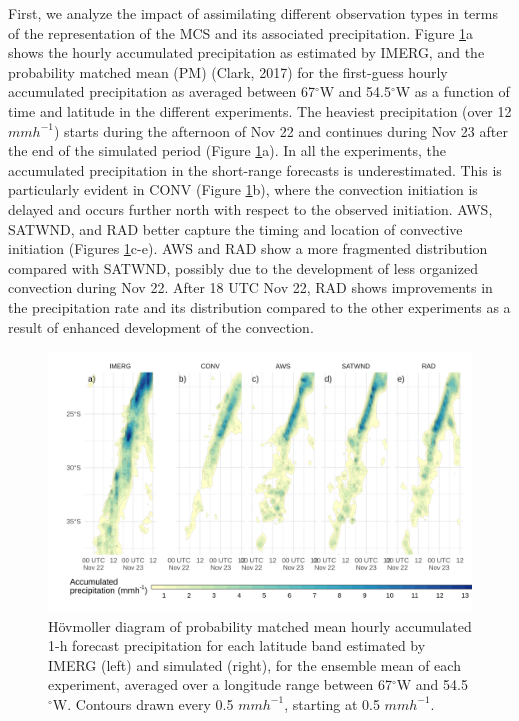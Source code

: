\documentclass[authoryear,preprint,review,12pt]{elsarticle} %
\begin{document}
First, we analyze the impact of assimilating different observation types in terms of the representation of the MCS and its associated precipitation. Figure \ref{fig:pp-hov}a shows the hourly accumulated precipitation as estimated by IMERG, and the probability matched mean (PM) (Clark, 2017) for the first-guess hourly accumulated precipitation as averaged between 67\(^{\circ}\)W and 54.5\(^{\circ}\)W as a function of time and latitude in the different experiments. The heaviest precipitation (over 12 \(mmh^{-1}\)) starts during the afternoon of Nov 22 and continues during Nov 23 after the end of the simulated period (Figure \ref{fig:pp-hov}a). In all the experiments, the accumulated precipitation in the short-range forecasts is underestimated. This is particularly evident in CONV (Figure \ref{fig:pp-hov}b), where the convection initiation is delayed and occurs further north with respect to the observed initiation. AWS, SATWND, and RAD better capture the timing and location of convective initiation (Figures \ref{fig:pp-hov}c-e). AWS and RAD show a more fragmented distribution compared with SATWND, possibly due to the development of less organized convection during Nov 22. After 18 UTC Nov 22, RAD shows improvements in the precipitation rate and its distribution compared to the other experiments as a result of enhanced development of the convection.



\begin{figure}[h]
\includegraphics{../figures/pp-hov-1} \caption{Hövmoller diagram of probability matched mean hourly accumulated 1-h forecast precipitation for each latitude band estimated by IMERG (left) and simulated (right), for the ensemble mean of each experiment, averaged over a longitude range between 67\(^{\circ}\)W and 54.5\(^{\circ}\)W. Contours drawn every 0.5 \(mmh^{-1}\), starting at 0.5 \(mmh^{-1}\).}\label{fig:pp-hov}
\end{figure}
\end{document}
